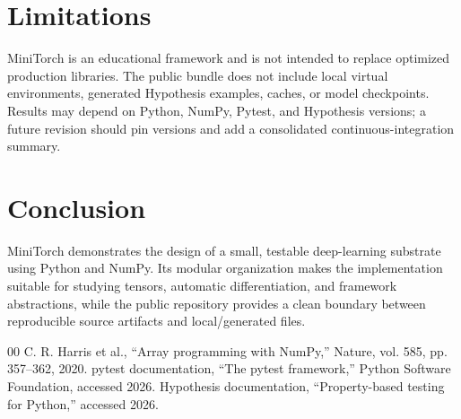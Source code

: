 \documentclass[conference]{IEEEtran}
\begin{document}
\section{Limitations}
MiniTorch is an educational framework and is not intended to replace optimized production libraries. The public bundle does not include local virtual environments, generated Hypothesis examples, caches, or model checkpoints. Results may depend on Python, NumPy, Pytest, and Hypothesis versions; a future revision should pin versions and add a consolidated continuous-integration summary.

\section{Conclusion}
MiniTorch demonstrates the design of a small, testable deep-learning substrate using Python and NumPy. Its modular organization makes the implementation suitable for studying tensors, automatic differentiation, and framework abstractions, while the public repository provides a clean boundary between reproducible source artifacts and local/generated files.

\begin{thebibliography}{00}
 C. R. Harris et al., ``Array programming with NumPy,'' Nature, vol. 585, pp. 357--362, 2020.
 pytest documentation, ``The pytest framework,'' Python Software Foundation, accessed 2026.
 Hypothesis documentation, ``Property-based testing for Python,'' accessed 2026.
\end{thebibliography}
\end{document}
